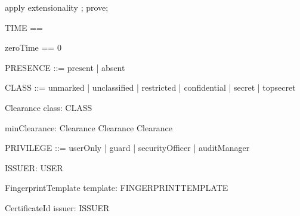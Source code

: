 \begin{zproof}[lElemDiffAbsorption]
apply extensionality ;
prove;
\end{zproof}

\begin{zed}
TIME == \nat
\end{zed}

\begin{zed}
zeroTime == 0
\end{zed}

\begin{zed}
PRESENCE ::= present | absent
\end{zed}

\begin{zed}
CLASS ::= unmarked | unclassified | restricted | confidential | secret | topsecret
\end{zed}

\begin{schema}{Clearance}
  class: CLASS
\end{schema}

\begin{axdef}
  minClearance: Clearance \cross  Clearance \fun  Clearance
\end{axdef}

\begin{zed}
PRIVILEGE ::= userOnly | guard | securityOfficer | auditManager
\end{zed}

\begin{zed}
  [USER]
\end{zed}

\begin{axdef}
  ISSUER: \power  USER
\end{axdef}

\begin{zed}
  [FINGERPRINT]
\end{zed}

\begin{zed}
  [FINGERPRINTTEMPLATE]
\end{zed}

\begin{schema}{FingerprintTemplate}
  template: FINGERPRINTTEMPLATE
\end{schema}

\begin{zed}
  [KEYPART]
\end{zed}

\begin{schema}{CertificateId}
  issuer: ISSUER
\end{schema}

